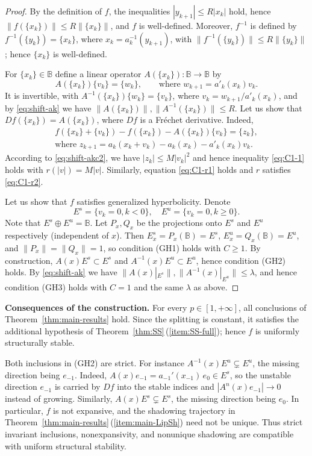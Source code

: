 \documentclass[12pt]{article}
\newcommand{\Bb}{\mathbb{B}}
\theoremstyle{definition}
\begin{document}
\begin{proof}
By the definition of $f$, the inequalities $|y_{k+1}| \leq R |x_k|$ hold, hence $\|f(\{x_k\})\| \leq R \|\{x_k\}\|$, and $f$ is well-defined. Moreover, $f^{-1}$ is defined by $f^{-1}(\{y_k\}) = \{x_k\}$, where $x_k = a_k^{-1}(y_{k+1})$, with $\|f^{-1}(\{y_k\})\| \leq R\|\{y_k\}\|$; hence $\{x_k\}$ is well-defined.

For $\{x_k\} \in \Bb$ define a linear operator $A(\{x_k\}):\Bb \to \Bb$ by
$$
A(\{x_k\})\{v_k\} = \{w_k\}, \qquad \mbox{where $w_{k+1} = a'_k(x_k)v_k$}.
$$
It is invertible, with $A^{-1}(\{x_k\})\{w_k\} = \{v_k\}$, where $v_k = w_{k+1}/a'_k(x_k)$, and by \eqref{eq:shift-ak} we have $\|A(\{x_k\})\|, \|A^{-1}(\{x_k\})\| \leq R$. 
Let us show that $Df(\{x_k\}) = A(\{x_k\})$, where $Df$ is a Fréchet derivative. Indeed,
    \begin{multline*}
    f(\{x_k\} + \{v_k\}) - f(\{x_k\}) - A(\{x_k\})\{v_k\} = \{z_k\}, \\ \mbox{where $z_{k+1} = a_k(x_k + v_k) - a_k(x_k) - a'_k(x_k)v_k$}.    
    \end{multline*}
According to \eqref{eq:shift-akc2}, we have $|z_k| \leq M|v_k|^2$ and hence inequality \eqref{eq:C1-1} holds with $r(|v|) = M|v|$. Similarly, equation \eqref{eq:C1-r1} holds and $r$ satisfies \eqref{eq:C1-r2}.

Let us show that $f$ satisfies generalized hyperbolicity. Denote 
    $$
    E^s = \{ v_k = 0, k < 0 \}, \quad E^u = \{ v_k = 0, k \geq 0 \}.
    $$
Note that $E^s \oplus E^u = \Bb$. Let $P_x, Q_x$ be the projections onto $E^s$ and $E^u$ respectively (independent of $x$). Then
    $
    E^s_x = P_x(\Bb) = E^s$, $E^u_x = Q_x(\Bb) = E^u$, and $\|P_x\| = \|Q_x\| = 1
    $,
so condition (GH1) holds with $C \geq 1$. By construction,
    $A(x)E^s \subset E^s$ and $A^{-1}(x)E^u \subset E^u$,
hence condition (GH2) holds. By \eqref{eq:shift-ak} we have $\|A(x)|_{E^s}\|, \|A^{-1}(x)|_{E^u}\| \leq \lambda$, and hence condition (GH3) holds with $C = 1$ and the same $\lambda$ as above.
\end{proof}

\noindent\textbf{Consequences of the construction.}
For every $p\in[1,+\infty]$, all conclusions of
Theorem~\ref{thm:main-results} hold. Since the splitting is constant,
it satisfies the additional hypothesis of
Theorem~\ref{thm:SS}\,(\ref{item:SS-full}); hence $f$ is uniformly
structurally stable.

Both inclusions in (GH2) are strict. 
For instance $A^{-1}(x)E^u \subsetneq E^u$, the missing direction being $e_{-1}$.
Indeed, $A(x)e_{-1} = a_{-1}'(x_{-1})\,e_0 \in E^s$, so the unstable direction $e_{-1}$ is carried by $Df$ into the stable indices and $|A^n(x)e_{-1}| \to 0$ instead of growing. Similarly, $A(x)E^s \subsetneq E^s$, the missing direction being $e_0$.
In particular, $f$ is not expansive, and the shadowing trajectory in Theorem~\ref{thm:main-results}\,(\ref{item:main-LipSh}) need not be unique. 
Thus strict invariant inclusions, nonexpansivity, and nonunique shadowing are compatible with uniform structural stability.
\end{document}
